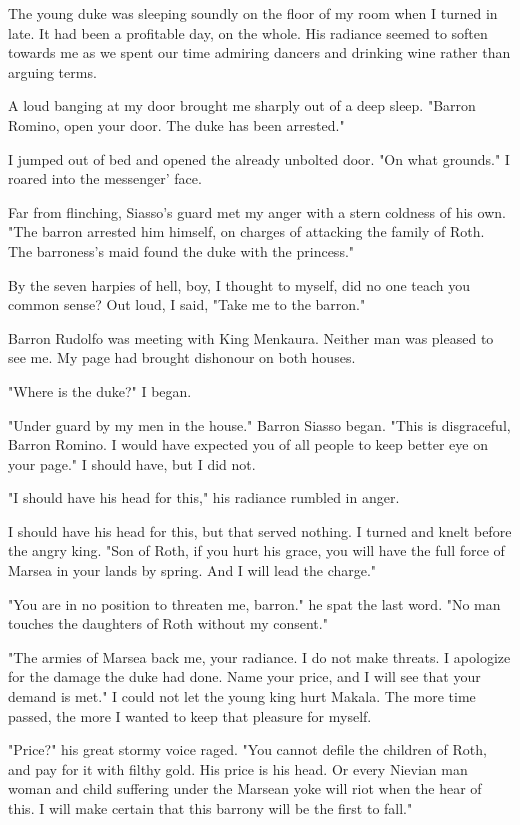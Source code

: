 \documentclass{article}
\begin{document}
The young duke  was sleeping soundly on the floor of my room when I turned in late. It had been a profitable day, on the whole. His radiance seemed to soften towards me as we spent our time admiring dancers and drinking wine rather than arguing terms.

\vspace{.5cm}

A loud banging at my door brought me sharply out of a deep sleep. "Barron Romino, open your door. The duke has been arrested."

I jumped out of bed and opened the already unbolted door. "On what grounds." I roared into the messenger' face.

Far from flinching, Siasso's guard met my anger with a stern coldness of his own. "The barron arrested him himself, on charges of attacking the family of Roth. The barroness's maid found the duke with the princess."

By the seven harpies of hell, boy, I thought to myself, did no one teach you common sense? Out loud, I said, "Take me to the barron." 

Barron Rudolfo was meeting with King Menkaura. Neither man was pleased to see me. My page had brought dishonour on both houses. 

"Where is the duke?" I began.

"Under guard by my men in the house." Barron Siasso began. "This is disgraceful, Barron Romino. I would have expected you of all people to keep better eye on your page." I should have, but I did not. 

"I should have his head for this," his radiance rumbled in anger. 

I should have his head for this, but that served nothing. I turned and knelt before the angry king. "Son of Roth, if you hurt his grace, you will have the full force of Marsea in your lands by spring. And I will lead the charge."

"You are in no position to threaten me, barron." he spat the last word. "No man touches the daughters of Roth without my consent."

"The armies of Marsea back me, your radiance. I do not make threats. I apologize for the damage the duke had done. Name your price, and I will see that your demand is met." I could not let the young king hurt Makala. The more time passed, the more I wanted to keep that pleasure for myself.

"Price?" his great stormy voice raged. "You cannot defile the children of Roth, and pay for it with filthy gold. His price is his head. Or every Nievian man woman and child suffering under the Marsean yoke will riot when the hear of this. I will make certain that this barrony will be the first to fall." 
\end{document}
